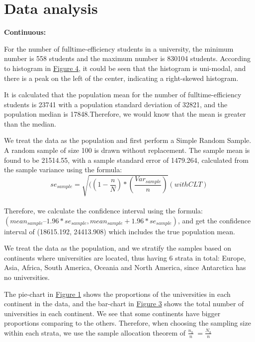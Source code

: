 \documentclass{article}
\begin{document}
\newpage
\section{Data analysis}
\textbf{Continuous:}

For the number of fulltime-efficiency students in a university, the minimum number is 558 students and the maximum number is 830104 students. According to histogram in {\hyperref[fig:test4]{Figure 4}}, it could be seen that the histogram is uni-modal, and there is a peak on the left of the center, indicating a right-skewed histogram.

It is calculated that the population mean for the number of fulltime-efficiency students is 23741 with a population standard deviation of 32821, and the population median is 17848.Therefore, we would know that the mean is greater than the median.\\


We treat the data as the population and first perform a Simple Random Sample. A random sample of size 100 is drawn without replacement.
The sample mean is found to be 21514.55, with a sample standard error of 1479.264, calculated from the sample variance using the formula:
$$se_{sample} = \sqrt{((1 - \frac{n}{N}) * (\frac{Var_{sample}}{n})} (with CLT)$$\\
Therefore, we calculate the confidence interval using the formula:\\
$(mean_{sample} – 1.96*se_{sample}, mean_{sample} + 1.96*se_{sample})$, and get the confidence interval of (18615.192, 24413.908) which includes the true population mean.


We treat the data as the population, and we stratify the samples based on continents where universities are located, thus having 6 strata in total: Europe, Asia, Africa, South America, Oceania and North America, since Antarctica has no universities.
  
  The pie-chart in {\hyperref[fig:test1]{Figure 1}}
   shows the proportions of the universities in each continent in the data, and the bar-chart in {\hyperref[fig:test3]{Figure 3}} shows the total number of universities in each continent. We see that some continents have bigger proportions comparing to the others. Therefore, when choosing the sampling size within each strata, we use the sample allocation theorem of $ \frac{n_h}{n}\ = \frac{N_h}{n}\ $
\end{document}
